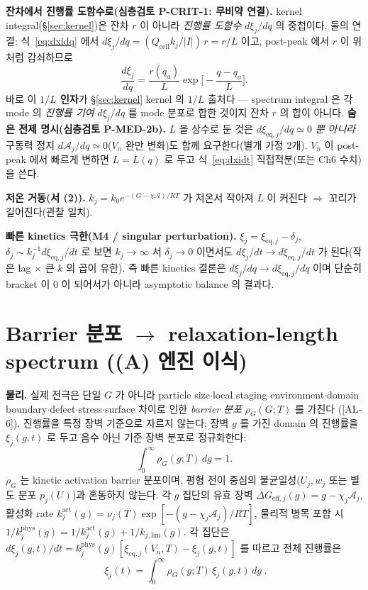 \documentclass[11pt,a4paper]{article}
\newcommand{\eff}{\mathrm{eff}}
\newcommand{\eq}{\mathrm{eq}}
\newcommand{\cell}{\mathrm{cell}}
\newcommand{\AL}[1]{\textsf{[AL-#1]}}
\begin{document}
\textbf{잔차에서 진행률 도함수로(심층검토 P-CRIT-1: 무비약 연결).} kernel integral(\S\ref{sec:kernel})은
잔차 $r$ 이 아니라 \emph{진행률 도함수} $d\xi_j/dq$ 의 중첩이다. 둘의 연결: 식~\eqref{eq:dxidq} 에서
$d\xi_j/dq=(Q_\cell k_j/|I|)\,r=r/L$ 이고, post-peak 에서 $r$ 이 위처럼 감쇠하므로
\begin{equation}
\frac{d\xi_j}{dq}=\frac{r(q_a)}{L}\exp\!\Big[-\frac{q-q_a}{L}\Big].
\label{eq:single_dxidq}
\end{equation}
바로 이 \textbf{$1/L$ 인자}가 \S\ref{sec:kernel} kernel 의 $1/L$ 출처다 — spectrum integral 은 각 mode 의
\emph{진행률 기여} $d\xi_j/dq$ 를 mode 분포로 합한 것이지 잔차 $r$ 의 합이 아니다.
\textbf{숨은 전제 명시(심층검토 P-MED-2b).} $L$ 을 상수로 둔 것은 $d\xi_{\eq,j}/dq\simeq0$ \emph{뿐 아니라}
구동력 정지 $d\mathcal A_j/dq\simeq0$($V_n$ 완만 변화)도 함께 요구한다(별개 가정 2개). $V_n$ 이 post-peak
에서 빠르게 변하면 $L=L(q)$ 로 두고 식~\eqref{eq:dxidt} 직접적분(또는 Ch6 수치)을 쓴다.

\textbf{저온 거동(서 (2)).} $k_j=k_0e^{-(G-\chi\mathcal A)/RT}$ 가 저온서 작아져 $L$ 이 커진다
$\Rightarrow$ 꼬리가 길어진다(관찰 일치).

\textbf{빠른 kinetics 극한(M4 / singular perturbation).} $\xi_j=\xi_{\eq,j}-\delta_j$,
$\delta_j\sim k_j^{-1}d\xi_{\eq,j}/dt$ 로 보면 $k_j\to\infty$ 서 $\delta_j\to0$ 이면서도
$d\xi_j/dt\to d\xi_{\eq,j}/dt$ 가 된다(작은 lag $\times$ 큰 $k$ 의 곱이 유한). 즉 빠른 kinetics 결론은
$d\xi_j/dq\to d\xi_{\eq,j}/dq$ 이며 단순히 bracket 이 0 이 되어서가 아니라 asymptotic balance 의 결과다.

\section{Barrier 분포 $\to$ relaxation-length spectrum ((A) 엔진 이식)}\label{sec:spectrum}
\textbf{물리.} 실제 전극은 단일 $G$ 가 아니라 particle size$\cdot$local staging environment$\cdot$domain
boundary$\cdot$defect$\cdot$stress$\cdot$surface 차이로 인한 \emph{barrier 분포} $\rho_G(G;T)$ 를 가진다
(\AL{6}). 진행률을 특정 장벽 기준으로 자르지 않는다; 장벽 $g$ 를 가진 domain 의 진행률을 $\xi_j(g,t)$ 로
두고 음수 아닌 기준 장벽 분포로 정규화한다:
\begin{equation}
\int_0^\infty \rho_G(g;T)\,dg=1.
\label{eq:rho_norm}
\end{equation}
$\rho_G$ 는 kinetic activation barrier 분포이며, 평형 전이 중심의 불균일성($U_j,w_j$ 또는 별도 분포
$p_j(U)$)과 혼동하지 않는다. 각 $g$ 집단의 유효 장벽 $\Delta G_{\eff,j}(g)=g-\chi_j\mathcal A_j$, 활성화
rate $k_j^\mathrm{act}(g)=\nu_j(T)\exp[-(g-\chi_j\mathcal A_j)/RT]$, 물리적 병목 포함 시
$1/k_j^\mathrm{phys}(g)=1/k_j^\mathrm{act}(g)+1/k_{j,\mathrm{lim}}(g)$. 각 집단은
$d\xi_j(g,t)/dt=k_j^\mathrm{phys}(g)[\xi_{\eq,j}(V_n,T)-\xi_j(g,t)]$ 를 따르고 전체 진행률은
\begin{equation}
\boxed{\;\xi_j(t)=\int_0^\infty \rho_G(g;T)\,\xi_j(g,t)\,dg\;.}
\label{eq:xi_dist}
\end{equation}
\end{document}
